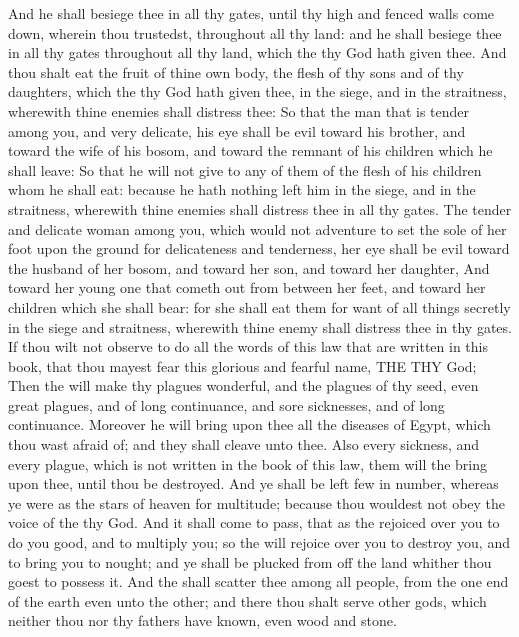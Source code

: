 \begin{biblechapter}
\verse And he shall besiege thee in all thy gates, until thy high and fenced walls come down, wherein thou trustedst, throughout all thy land: and he shall besiege thee in all thy gates throughout all thy land, which the \LORD thy God hath given thee.
\verse And thou shalt eat the fruit of thine own body, the flesh of thy sons and of thy daughters, which the \LORD thy God hath given thee, in the siege, and in the straitness, wherewith thine enemies shall distress thee:
\verse So that the man that is tender among you, and very delicate, his eye shall be evil toward his brother, and toward the wife of his bosom, and toward the remnant of his children which he shall leave:
\verse So that he will not give to any of them of the flesh of his children whom he shall eat: because he hath nothing left him in the siege, and in the straitness, wherewith thine enemies shall distress thee in all thy gates.
\verse The tender and delicate woman among you, which would not adventure to set the sole of her foot upon the ground for delicateness and tenderness, her eye shall be evil toward the husband of her bosom, and toward her son, and toward her daughter,
\verse And toward her young one that cometh out from between her feet, and toward her children which she shall bear: for she shall eat them for want of all things secretly in the siege and straitness, wherewith thine enemy shall distress thee in thy gates.
\verse If thou wilt not observe to do all the words of this law that are written in this book, that thou mayest fear this glorious and fearful name, THE \LORD THY God;
\verse Then the \LORD will make thy plagues wonderful, and the plagues of thy seed, even great plagues, and of long continuance, and sore sicknesses, and of long continuance.
\verse Moreover he will bring upon thee all the diseases of Egypt, which thou wast afraid of; and they shall cleave unto thee.
\verse Also every sickness, and every plague, which is not written in the book of this law, them will the \LORD bring upon thee, until thou be destroyed.
\verse And ye shall be left few in number, whereas ye were as the stars of heaven for multitude; because thou wouldest not obey the voice of the \LORD thy God.
\verse And it shall come to pass, that as the \LORD rejoiced over you to do you good, and to multiply you; so the \LORD will rejoice over you to destroy you, and to bring you to nought; and ye shall be plucked from off the land whither thou goest to possess it.
\verse And the \LORD shall scatter thee among all people, from the one end of the earth even unto the other; and there thou shalt serve other gods, which neither thou nor thy fathers have known, even wood and stone.

\end{biblechapter}
